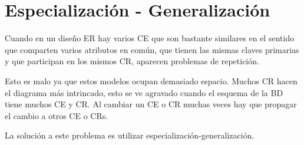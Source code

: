 \documentclass[12pt,a4paper]{report}
\begin{document}
	\section{Especialización - Generalización}
		Cuando en un diseño ER hay varios CE que son bastante similares en el sentido que comparten varios atributos en común, que tienen las mismas claves primarias y que participan en los mismos CR, aparecen problemas de repetición.		
		\par Esto es malo ya que estos modelos ocupan demasiado espacio. Muchos CR hacen el diagrama más intrincado, esto se ve agravado cuando el esquema de la BD tiene muchos CE y CR. Al cambiar un CE o CR muchas veces hay que propagar el cambio a otros CE o CRs.
		
		\par La solución a este problema es utilizar especialización-generalización.
\end{document}
